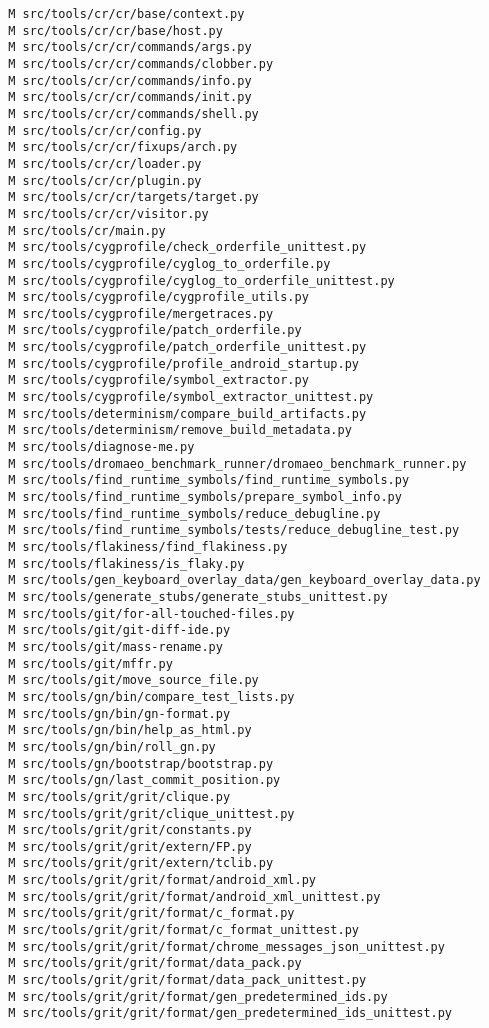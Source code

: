 \documentclass{article}
\begin{document}
\begin{verbatim}
 M src/tools/cr/cr/base/context.py
 M src/tools/cr/cr/base/host.py
 M src/tools/cr/cr/commands/args.py
 M src/tools/cr/cr/commands/clobber.py
 M src/tools/cr/cr/commands/info.py
 M src/tools/cr/cr/commands/init.py
 M src/tools/cr/cr/commands/shell.py
 M src/tools/cr/cr/config.py
 M src/tools/cr/cr/fixups/arch.py
 M src/tools/cr/cr/loader.py
 M src/tools/cr/cr/plugin.py
 M src/tools/cr/cr/targets/target.py
 M src/tools/cr/cr/visitor.py
 M src/tools/cr/main.py
 M src/tools/cygprofile/check_orderfile_unittest.py
 M src/tools/cygprofile/cyglog_to_orderfile.py
 M src/tools/cygprofile/cyglog_to_orderfile_unittest.py
 M src/tools/cygprofile/cygprofile_utils.py
 M src/tools/cygprofile/mergetraces.py
 M src/tools/cygprofile/patch_orderfile.py
 M src/tools/cygprofile/patch_orderfile_unittest.py
 M src/tools/cygprofile/profile_android_startup.py
 M src/tools/cygprofile/symbol_extractor.py
 M src/tools/cygprofile/symbol_extractor_unittest.py
 M src/tools/determinism/compare_build_artifacts.py
 M src/tools/determinism/remove_build_metadata.py
 M src/tools/diagnose-me.py
 M src/tools/dromaeo_benchmark_runner/dromaeo_benchmark_runner.py
 M src/tools/find_runtime_symbols/find_runtime_symbols.py
 M src/tools/find_runtime_symbols/prepare_symbol_info.py
 M src/tools/find_runtime_symbols/reduce_debugline.py
 M src/tools/find_runtime_symbols/tests/reduce_debugline_test.py
 M src/tools/flakiness/find_flakiness.py
 M src/tools/flakiness/is_flaky.py
 M src/tools/gen_keyboard_overlay_data/gen_keyboard_overlay_data.py
 M src/tools/generate_stubs/generate_stubs_unittest.py
 M src/tools/git/for-all-touched-files.py
 M src/tools/git/git-diff-ide.py
 M src/tools/git/mass-rename.py
 M src/tools/git/mffr.py
 M src/tools/git/move_source_file.py
 M src/tools/gn/bin/compare_test_lists.py
 M src/tools/gn/bin/gn-format.py
 M src/tools/gn/bin/help_as_html.py
 M src/tools/gn/bin/roll_gn.py
 M src/tools/gn/bootstrap/bootstrap.py
 M src/tools/gn/last_commit_position.py
 M src/tools/grit/grit/clique.py
 M src/tools/grit/grit/clique_unittest.py
 M src/tools/grit/grit/constants.py
 M src/tools/grit/grit/extern/FP.py
 M src/tools/grit/grit/extern/tclib.py
 M src/tools/grit/grit/format/android_xml.py
 M src/tools/grit/grit/format/android_xml_unittest.py
 M src/tools/grit/grit/format/c_format.py
 M src/tools/grit/grit/format/c_format_unittest.py
 M src/tools/grit/grit/format/chrome_messages_json_unittest.py
 M src/tools/grit/grit/format/data_pack.py
 M src/tools/grit/grit/format/data_pack_unittest.py
 M src/tools/grit/grit/format/gen_predetermined_ids.py
 M src/tools/grit/grit/format/gen_predetermined_ids_unittest.py

\end{verbatim}
\end{document}
